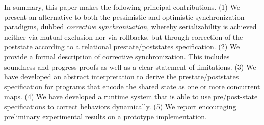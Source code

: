 In summary, this paper makes the following principal contributions.
  (1) We present an alternative to both the pessimistic and optimistic synchronization paradigms, dubbed \emph{corrective synchronization}, whereby serializability is achieved neither via mutual exclusion nor via rollbacks, but through correction of the poststate according to a relational prestate/poststates specification.
(2) We provide a formal description of corrective synchronization. This includes soundness and progress proofs as well as a clear statement of limitations.
	(3) We have developed an abstract interpretation to derive the prestate/poststates specification for programs that encode the shared state as one or more concurrent maps. 
(4) We have developed a runtime system that is able to use
pre/post-state specifications to correct behaviors dynamically.
%
(5) We report encouraging preliminary experimental results on
a prototype implementation.

